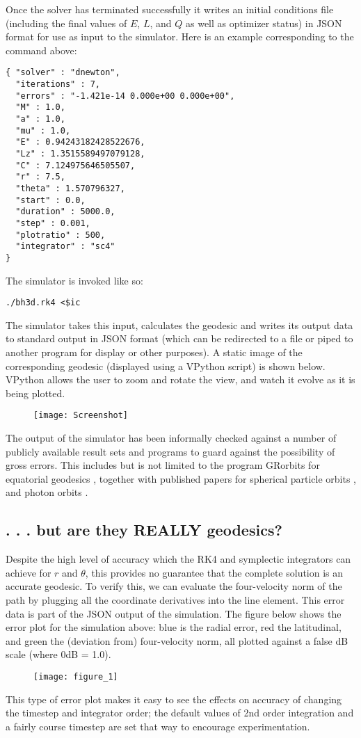 \documentclass[11pt]{article}
\begin{document}
Once the solver has terminated successfully it writes an initial conditions file (including the final values of $E$, $L$, and $Q$ as well as optimizer status) in JSON format for use as input to the simulator.  Here is an example corresponding to the command above:
\begin{verbatim}
{ "solver" : "dnewton",
  "iterations" : 7,
  "errors" : "-1.421e-14 0.000e+00 0.000e+00",
  "M" : 1.0,
  "a" : 1.0,
  "mu" : 1.0,
  "E" : 0.94243182428522676,
  "Lz" : 1.3515589497079128,
  "C" : 7.124975646505507,
  "r" : 7.5,
  "theta" : 1.570796327,
  "start" : 0.0,
  "duration" : 5000.0,
  "step" : 0.001,
  "plotratio" : 500,
  "integrator" : "sc4"
}
\end{verbatim}
The simulator is invoked like so:
\begin{verbatim}
./bh3d.rk4 <$ic
\end{verbatim}
The simulator takes this input, calculates the geodesic and writes its output data to standard output in JSON format (which can be redirected to a file or piped to another program for display or other purposes).  A static image of the corresponding geodesic (displayed using a VPython script) is shown below.  VPython allows the user to zoom and rotate the view, and watch it evolve as it is being plotted.
\begin{figure}[h]
\texttt{[image: Screenshot]}
\end{figure}
The output of the simulator has been informally checked against a number of publicly available result sets and programs to guard against the possibility of gross errors.  This includes  but is not limited to the program GRorbits for equatorial geodesics \cite{grorbits}, together with published papers for spherical particle orbits \cite{teo}, and photon orbits \cite{kheng}.

\subsection{. . . but are they REALLY geodesics?}

Despite the high level of accuracy which the RK4 and symplectic integrators can achieve for $r$ and $\theta$, this provides no guarantee that the complete solution is an accurate geodesic.  To verify this, we can evaluate the four-velocity norm of the path by plugging all the coordinate derivatives into the line element.  This error data is part of the JSON output of the simulation.  The figure below shows the error plot for the simulation above: blue is the radial error, red the latitudinal, and green the (deviation from) four-velocity norm, all plotted against a false dB scale (where 0dB = 1.0).
\begin{figure}[h]
\texttt{[image: figure\_1]}
\end{figure}
This type of error plot makes it easy to see the effects on accuracy of changing the timestep and integrator order; the default values of 2nd order integration and a fairly course timestep are set that way to encourage experimentation.
\end{document}
